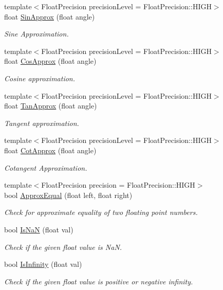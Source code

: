 \begin{DoxyCompactItemize}
{\footnotesize template$<$Float\+Precision precision\+Level = Float\+Precision\+::\+H\+I\+G\+H$>$ }\\float \hyperlink{group___s_i_s_d_scalar_math_gacf3bf50cb40374d40ffd25e382ca53c8}{Sin\+Approx} (float angle)
\begin{DoxyCompactList}\small\item\em Sine Approximation. \end{DoxyCompactList}\item 
{\footnotesize template$<$Float\+Precision precision\+Level = Float\+Precision\+::\+H\+I\+G\+H$>$ }\\float \hyperlink{group___s_i_s_d_scalar_math_ga4c7f22bb5c746703d834991b074e2721}{Cos\+Approx} (float angle)
\begin{DoxyCompactList}\small\item\em Cosine approximation. \end{DoxyCompactList}\item 
{\footnotesize template$<$Float\+Precision precision\+Level = Float\+Precision\+::\+H\+I\+G\+H$>$ }\\float \hyperlink{group___s_i_s_d_scalar_math_gac117306c04c7d0b931c3b2b4eb4fd6ae}{Tan\+Approx} (float angle)
\begin{DoxyCompactList}\small\item\em Tangent approximation. \end{DoxyCompactList}\item 
{\footnotesize template$<$Float\+Precision precision\+Level = Float\+Precision\+::\+H\+I\+G\+H$>$ }\\float \hyperlink{group___s_i_s_d_scalar_math_ga6914719e1538a2c1d58828197bc76041}{Cot\+Approx} (float angle)
\begin{DoxyCompactList}\small\item\em Cotangent Approximation. \end{DoxyCompactList}\item 
{\footnotesize template$<$Float\+Precision precision = Float\+Precision\+::\+H\+I\+G\+H$>$ }\\bool \hyperlink{group___s_i_s_d_scalar_math_ga384f6df082ace9bc432bac8fac5b6686}{Approx\+Equal} (float left, float right)
\begin{DoxyCompactList}\small\item\em Check for approximate equality of two floating point numbers. \end{DoxyCompactList}\item 
bool \hyperlink{group___s_i_s_d_scalar_math_ga894ca122cd6d482ed5608f3410bc2bb4}{Is\+Na\+N} (float val)
\begin{DoxyCompactList}\small\item\em Check if the given float value is Na\+N. \end{DoxyCompactList}\item 
bool \hyperlink{group___s_i_s_d_scalar_math_ga29ffc432e0aaaa5201bfca15247fa648}{Is\+Infinity} (float val)
\begin{DoxyCompactList}\small\item\em Check if the given float value is positive or negative infinity. \end{DoxyCompactList}\end{DoxyCompactItemize}
